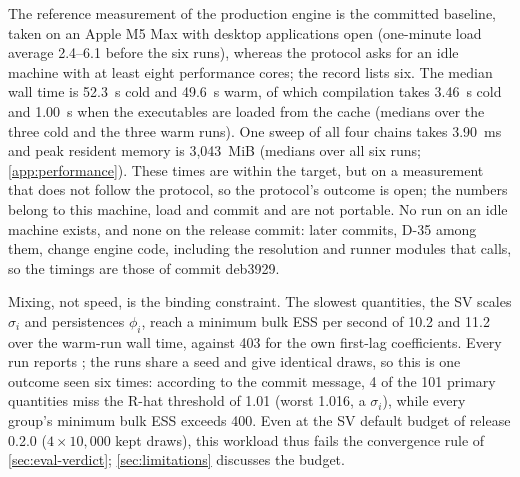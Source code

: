 The reference measurement of the production engine is the committed baseline, taken on an Apple M5 Max with desktop applications open (one-minute load average 2.4--6.1 before the six runs), whereas the protocol asks for an idle machine with at least eight performance cores; the record lists six. %
The median wall time is 52.3~s cold and 49.6~s warm, of which compilation takes 3.46~s cold and 1.00~s when the executables are loaded from the cache (medians over the three cold and the three warm runs). %
One sweep of all four chains takes 3.90~ms and peak resident memory is 3,043~MiB (medians over all six runs; \cref{app:performance}). %
These times are within the target, but on a measurement that does not follow the protocol, so the protocol's outcome is open; the numbers belong to this machine, load and commit and are not portable. %
No run on an idle machine exists, and none on the release commit: later commits, D-35 among them,
change engine code, including the resolution and runner modules that  calls, so the
timings are those of commit deb3929. %

Mixing, not speed, is the binding constraint.
The slowest quantities, the SV scales $\sigma_i$ and persistences $\phi_i$, reach a minimum bulk ESS per second of 10.2 and 11.2 over the warm-run wall time, against 403 for the own first-lag coefficients. %
Every run reports ; the runs share a seed and give identical draws, so this is one outcome seen six times: according to the commit message, 4 of the 101 primary quantities miss the R-hat threshold of 1.01 (worst 1.016, a $\sigma_i$), while every group's minimum bulk ESS exceeds 400. %
Even at the SV default budget of release 0.2.0 ($4 \times 10{,}000$ kept draws), this workload thus fails the convergence rule of \cref{sec:eval-verdict}; \cref{sec:limitations} discusses the budget. %

